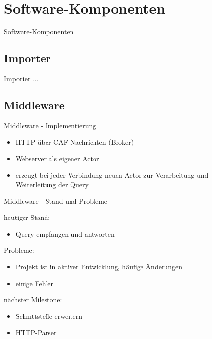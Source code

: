 \documentclass[9pt]{beamer}
\begin{document}
\section{Software-Komponenten}

\begin{frame}{Software-Komponenten}{}
	\begin{center}
	\end{center}
\end{frame}

\subsection{Importer}

\begin{frame}{Importer}{}
	...
\end{frame}

\subsection{Middleware}

\begin{frame}{Middleware - Implementierung}{}
	\begin{itemize}
		\item HTTP über CAF-Nachrichten (Broker)
		\item Webserver als eigener Actor
		\item erzeugt bei jeder Verbindung neuen Actor zur Verarbeitung und Weiterleitung der Query
	\end{itemize}
	\begin{center}
	\end{center}
\end{frame}

\begin{frame}{Middleware - Stand und Probleme}{}

	heutiger Stand:
	\begin{itemize}
		\item Query empfangen und antworten
	\end{itemize}

	Probleme:
	\begin{itemize}
		\item Projekt ist in aktiver Entwicklung, häufige Änderungen
		\item einige Fehler
	\end{itemize}
	
	nächster Milestone:
	\begin{itemize}
		\item Schnittstelle erweitern
		\item HTTP-Parser
	\end{itemize}

\end{frame}
\end{document}
